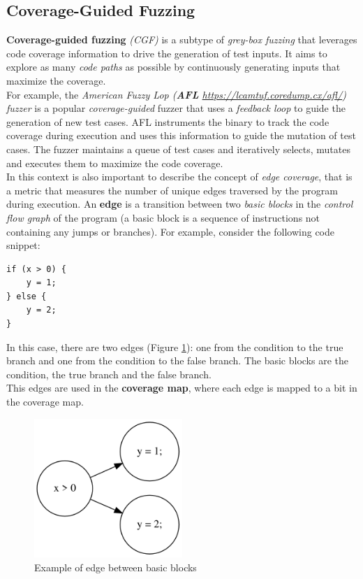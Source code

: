 \subsection{Coverage-Guided Fuzzing}
\textbf{Coverage-guided fuzzing} \textit{(CGF)} is a subtype of \textit{grey-box fuzzing} that leverages code coverage information to drive the generation of test inputs. It aims to explore as many \textit{code paths} as possible by continuously generating inputs that maximize the coverage.
\\For example, the \textit{American Fuzzy Lop (\textbf{AFL} \href{https://lcamtuf.coredump.cx/afl/}{https://lcamtuf.coredump.cx/afl/}) fuzzer} is a popular \textit{coverage-guided} fuzzer that uses a \textit{feedback loop} to guide the generation of new test cases. AFL instruments the binary to track the code coverage during execution and uses this information to guide the mutation of test cases. The fuzzer maintains a queue of test cases and iteratively selects, mutates and executes them to maximize the code coverage.
\\In this context is also important to describe the concept of \textit{edge coverage}, that is a metric that measures the number of unique edges traversed by the program during execution. An \textbf{edge} is a transition between two \textit{basic blocks} in the \textit{control flow graph} of the program (a basic block is a sequence of instructions not containing any jumps or branches).
For example, consider the following code snippet:
\begin{lstlisting}
if (x > 0) {
    y = 1;
} else {
    y = 2;
}
\end{lstlisting}
In this case, there are two edges (Figure \ref{fig:sample_edge_graph}): one from the condition to the true branch and one from the condition to the false branch. The basic blocks are the condition, the true branch and the false branch.
\\This edges are used in the \textbf{coverage map}, where each edge is mapped to a bit in the coverage map.
\begin{figure}[H]
    \centering
    \includegraphics[width=0.5\textwidth]{Images/sample_edge_graph.png}
    \caption{Example of edge between basic blocks}
    \label{fig:sample_edge_graph}
\end{figure}
